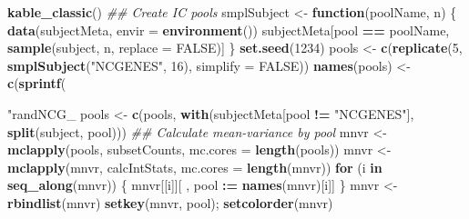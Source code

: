 \documentclass[11pt,letterpaper]{book}
\newenvironment{Shaded}{\begin{snugshade}}{\end{snugshade}}
\newcommand{\CommentTok}[1]{\textcolor[rgb]{0.56,0.35,0.01}{\textit{#1}}}
\newcommand{\ControlFlowTok}[1]{\textcolor[rgb]{0.13,0.29,0.53}{\textbf{#1}}}
\newcommand{\DataTypeTok}[1]{\textcolor[rgb]{0.13,0.29,0.53}{#1}}
\newcommand{\DecValTok}[1]{\textcolor[rgb]{0.00,0.00,0.81}{#1}}
\newcommand{\ErrorTok}[1]{\textcolor[rgb]{0.64,0.00,0.00}{\textbf{#1}}}
\newcommand{\KeywordTok}[1]{\textcolor[rgb]{0.13,0.29,0.53}{\textbf{#1}}}
\newcommand{\NormalTok}[1]{#1}
\newcommand{\OperatorTok}[1]{\textcolor[rgb]{0.81,0.36,0.00}{\textbf{#1}}}
\newcommand{\OtherTok}[1]{\textcolor[rgb]{0.56,0.35,0.01}{#1}}
\newcommand{\StringTok}[1]{\textcolor[rgb]{0.31,0.60,0.02}{#1}}
\begin{document}
\begin{Shaded}
\begin{Highlighting}[]
{{{\StringTok{  }\KeywordTok{kable_classic}\NormalTok{()}
\CommentTok{## Create IC pools}
\NormalTok{smplSubject <-}\StringTok{ }\ControlFlowTok{function}\NormalTok{(poolName, n) \{}
  \KeywordTok{data}\NormalTok{(subjectMeta, }\DataTypeTok{envir =} \KeywordTok{environment}\NormalTok{())}
\NormalTok{  subjectMeta[pool }\OperatorTok{==}\StringTok{ }\NormalTok{poolName, }\KeywordTok{sample}\NormalTok{(subject, n, }\DataTypeTok{replace =} \OtherTok{FALSE}\NormalTok{)]}
\NormalTok{\}}
\KeywordTok{set.seed}\NormalTok{(}\DecValTok{1234}\NormalTok{)}
\NormalTok{pools <-}\StringTok{ }\KeywordTok{c}\NormalTok{(}\KeywordTok{replicate}\NormalTok{(}\DecValTok{5}\NormalTok{, }\KeywordTok{smplSubject}\NormalTok{(}\StringTok{"NCGENES"}\NormalTok{, }\DecValTok{16}\NormalTok{), }\DataTypeTok{simplify =} \OtherTok{FALSE}\NormalTok{))}
\KeywordTok{names}\NormalTok{(pools) <-}\StringTok{ }\KeywordTok{c}\NormalTok{(}\KeywordTok{sprintf}\NormalTok{(}\StringTok{"randNCG_%d"}\NormalTok{, }\DecValTok{1}\OperatorTok{:}\DecValTok{5}\NormalTok{))}
\NormalTok{pools <-}\StringTok{ }\KeywordTok{c}\NormalTok{(pools,}
           \KeywordTok{with}\NormalTok{(subjectMeta[pool }\OperatorTok{!=}\StringTok{ "NCGENES"}\NormalTok{], }\KeywordTok{split}\NormalTok{(subject, pool)))}
\CommentTok{## Calculate mean-variance by pool}
\NormalTok{mnvr <-}\StringTok{ }\KeywordTok{mclapply}\NormalTok{(pools, subsetCounts, }\DataTypeTok{mc.cores =} \KeywordTok{length}\NormalTok{(pools))}
\NormalTok{mnvr <-}\StringTok{ }\KeywordTok{mclapply}\NormalTok{(mnvr, calcIntStats, }\DataTypeTok{mc.cores =} \KeywordTok{length}\NormalTok{(mnvr))}
\ControlFlowTok{for}\NormalTok{ (i }\ControlFlowTok{in} \KeywordTok{seq_along}\NormalTok{(mnvr)) \{}
\NormalTok{  mnvr[[i]][ , pool }\OperatorTok{:}\ErrorTok{=}\StringTok{ }\KeywordTok{names}\NormalTok{(mnvr)[i]]}
\NormalTok{\}}
\NormalTok{mnvr <-}\StringTok{ }\KeywordTok{rbindlist}\NormalTok{(mnvr)}
\KeywordTok{setkey}\NormalTok{(mnvr, pool); }\KeywordTok{setcolorder}\NormalTok{(mnvr)}

}}}}
\end{Highlighting}
\end{Shaded}
\end{document}
